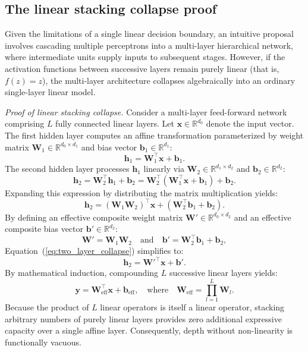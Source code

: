 \documentclass[../../main.tex]{subfiles}
\begin{document}
\subsection{The linear stacking collapse proof}
\label{subsec:linear_stacking_collapse}

Given the limitations of a single linear decision boundary, an intuitive proposal involves cascading multiple perceptrons into a multi-layer hierarchical network, where intermediate units supply inputs to subsequent stages. However, if the activation functions between successive layers remain purely linear (that is, $f(z) = z$), the multi-layer architecture collapses algebraically into an ordinary single-layer linear model.

\textit{Proof of linear stacking collapse.} Consider a multi-layer feed-forward network comprising $L$ fully connected linear layers. Let $\mathbf{x} \in \mathbb{R}^{d_0}$ denote the input vector. The first hidden layer computes an affine transformation parameterized by weight matrix $\mathbf{W}_1 \in \mathbb{R}^{d_0 \times d_1}$ and bias vector $\mathbf{b}_1 \in \mathbb{R}^{d_1}$:
\begin{equation}
\mathbf{h}_1 = \mathbf{W}_1^\top \mathbf{x} + \mathbf{b}_1.
\end{equation}
The second hidden layer processes $\mathbf{h}_1$ linearly via $\mathbf{W}_2 \in \mathbb{R}^{d_1 \times d_2}$ and $\mathbf{b}_2 \in \mathbb{R}^{d_2}$:
\begin{equation}
\mathbf{h}_2 = \mathbf{W}_2^\top \mathbf{h}_1 + \mathbf{b}_2 = \mathbf{W}_2^\top \left( \mathbf{W}_1^\top \mathbf{x} + \mathbf{b}_1 \right) + \mathbf{b}_2.
\end{equation}
Expanding this expression by distributing the matrix multiplication yields:
\begin{equation}
\mathbf{h}_2 = \left( \mathbf{W}_1 \mathbf{W}_2 \right)^\top \mathbf{x} + \left( \mathbf{W}_2^\top \mathbf{b}_1 + \mathbf{b}_2 \right).
\label{eq:two_layer_collapse}
\end{equation}
By defining an effective composite weight matrix $\mathbf{W}' \in \mathbb{R}^{d_0 \times d_2}$ and an effective composite bias vector $\mathbf{b}' \in \mathbb{R}^{d_2}$:
\begin{equation}
\mathbf{W}' = \mathbf{W}_1 \mathbf{W}_2 \quad \text{and} \quad \mathbf{b}' = \mathbf{W}_2^\top \mathbf{b}_1 + \mathbf{b}_2,
\end{equation}
Equation~(\ref{eq:two_layer_collapse}) simplifies to:
\begin{equation}
\mathbf{h}_2 = \mathbf{W}'^\top \mathbf{x} + \mathbf{b}'.
\end{equation}
By mathematical induction, compounding $L$ successive linear layers yields:
\begin{equation}
\mathbf{y} = \mathbf{W}_{\text{eff}}^\top \mathbf{x} + \mathbf{b}_{\text{eff}}, \quad \text{where} \quad \mathbf{W}_{\text{eff}} = \prod_{l=1}^L \mathbf{W}_l.
\end{equation}
Because the product of $L$ linear operators is itself a linear operator, stacking arbitrary numbers of purely linear layers provides zero additional expressive capacity over a single affine layer. Consequently, depth without non-linearity is functionally vacuous.
\end{document}
